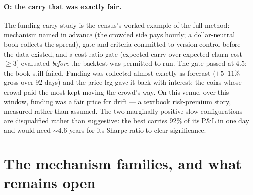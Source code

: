 \documentclass[11pt,a4paper]{article}
\begin{document}
\paragraph{O: the carry that was exactly fair.} The funding-carry study
is the census's worked example of the full method: mechanism named in
advance (the crowded side pays hourly; a dollar-neutral book collects
the spread), gate and criteria committed to version control before the
data existed, and a cost-ratio gate (expected carry over expected
churn cost $\ge 3$) evaluated \emph{before} the backtest was permitted
to run. The gate passed at $4.5$; the book still failed. Funding was
collected almost exactly as forecast ($+5$--$11\%$ gross over 92 days)
and the price leg gave it back with interest: the coins whose crowd
paid the most kept moving the crowd's way. On this venue, over this
window, funding was a fair price for drift --- a textbook risk-premium
story, measured rather than assumed. The two marginally positive slow
configurations are disqualified rather than suggestive: the best
carries 92\% of its P\&L in one day and would need
${\sim}4.6$ years for its Sharpe ratio to clear significance.

\section{The mechanism families, and what remains open}
\label{sec:families}
\end{document}
